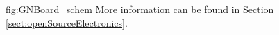 \begin{landscape}

\begin{figure}[tb] 
\centering
{fig:GNBoard_schem}{
More information can be found in Section \ref{sect:openSourceElectronics}.
}
\end{figure}

\end{landscape}

\restoregeometry

\newpage \thispagestyle{empty} %


